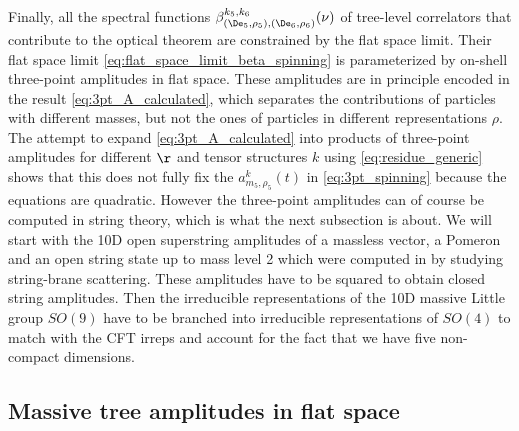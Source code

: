 Finally, all the spectral functions $\beta^{k_5,k_6}_{(\De_5,\rho_5),(\De_6,\rho_6)} (\nu)$ of tree-level correlators that contribute to the optical theorem are constrained 
by the flat space limit. Their flat space limit \eqref{eq:flat_space_limit_beta_spinning} is parameterized by on-shell three-point amplitudes in flat space.
These amplitudes are in principle encoded in the result \eqref{eq:3pt_A_calculated},
which separates the contributions of particles with different masses, but not the ones of particles in different representations $\rho$. 
The attempt to expand \eqref{eq:3pt_A_calculated} into products of three-point amplitudes for different $\r$ and tensor structures $k$ using \eqref{eq:residue_generic} shows that this does not fully fix the $a_{m_5,\rho_5}^{k}(t)$ in \eqref{eq:3pt_spinning} because the equations are quadratic.
However the three-point amplitudes can of course be computed in string theory, which is what the next subsection is about.
We will start with the 10D open superstring amplitudes of a massless vector, a Pomeron and an open string state up to mass level 2 which were computed in \cite{DAppollonio:2013mgj} by studying string-brane scattering. These amplitudes have to be squared to obtain closed string amplitudes. Then the irreducible representations of the 10D massive Little group $SO(9)$ have to be branched into irreducible representations of $SO(4)$ to match with the CFT irreps and account for the fact that we have five non-compact dimensions.




\subsection{Massive tree amplitudes in flat space}
\label{sec:massive_tree_flat}

